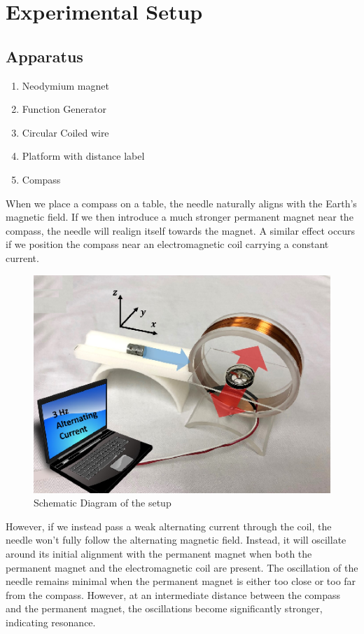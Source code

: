 \section{Experimental Setup}

\subsection*{Apparatus}

\begin{enumerate}
    \item Neodymium magnet
    \item Function Generator
    \item Circular Coiled wire
    \item Platform with distance label
    \item Compass\\
\end{enumerate}

When we place a compass on a table, the needle naturally aligns with the Earth's magnetic field. If we then introduce a much stronger permanent magnet near the compass, the needle will realign itself towards the magnet. A similar effect occurs if we position the compass near an electromagnetic coil carrying a constant current.

\begin{figure}[H]
    \centering
    \includegraphics[width=1\columnwidth]{images/f.png}
    \caption{Schematic Diagram of the setup}
\end{figure}

However, if we instead pass a weak alternating current through the coil, the needle won't fully follow the alternating magnetic field. Instead, it will oscillate around its initial alignment with the permanent magnet when both the permanent magnet and the electromagnetic coil are present. The oscillation of the needle remains minimal when the permanent magnet is either too close or too far from the compass. However, at an intermediate distance between the compass and the permanent magnet, the oscillations become significantly stronger, indicating resonance.